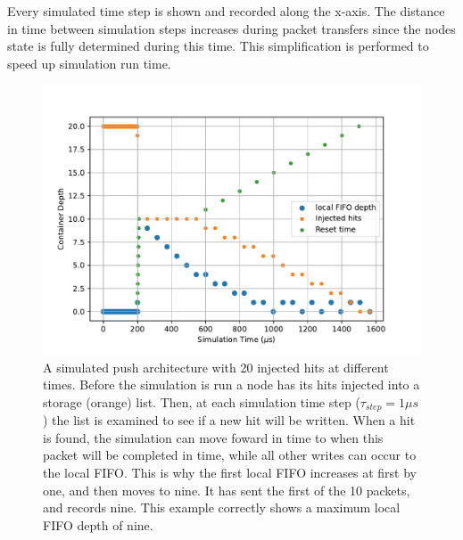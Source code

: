 Every simulated time step is shown and recorded along the x-axis.
The distance in time between simulation steps increases during packet transfers since the nodes state is fully determined during this time.
This simplification is performed to speed up simulation run time.

\begin{figure}[]
\centering
\includegraphics[width=\textwidth]{images/push_arch_buff.pdf}
\caption{A simulated push architecture with 20 injected hits at different times.
Before the simulation is run a node has its hits injected into a storage (orange) list.
Then, at each simulation time step ($\tau_{step}=1\unit{\mu s}$) the list is examined to see if a new hit will be written.
When a hit is found, the simulation can move foward in time to when this packet will be completed in time, while all other writes can occur to the local FIFO.
This is why the first local FIFO increases at first by one, and then moves to nine. It has sent the first of the 10 packets, and records nine.
This example correctly shows a maximum local FIFO depth of nine.
}
\end{figure}~\label{fig:push_arch_verification}
